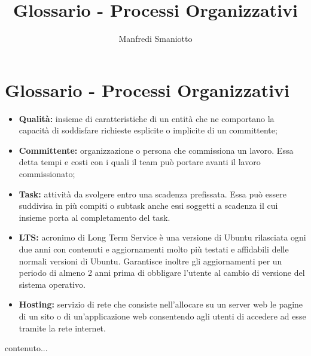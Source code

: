 \documentclass[openany,12pt,a4paper]{report}
\title{Glossario - Processi Organizzativi}
\author{Manfredi Smaniotto}
\begin{document}
	\chapter{Glossario - Processi Organizzativi}
	
	\begin{itemize}
		\item{\textbf{Qualità:}} insieme di caratteristiche di un entità che ne comportano la capacità di soddisfare richieste esplicite o implicite di un committente;
		\item{\textbf{Committente:}} organizzazione o persona che commissiona un lavoro. Essa detta tempi e costi con i quali il team può portare avanti il lavoro commissionato;
		\item{\textbf{Task:}} attività da svolgere entro una scadenza prefissata. Essa può essere suddivisa in più compiti o subtask anche essi soggetti a scadenza il cui insieme porta al completamento del task.
		\item{\textbf{LTS:}} acronimo di Long Term Service è una versione di Ubuntu rilasciata ogni due anni con contenuti e aggiornamenti molto più testati e affidabili delle normali versioni di Ubuntu. Garantisce inoltre gli aggiornamenti per un periodo di almeno 2 anni prima di obbligare l'utente al cambio di versione del sistema operativo.
		\item {\textbf{Hosting:}} servizio di rete che consiste nell'allocare su un server web le pagine di un sito o di un'applicazione web consentendo agli utenti di accedere ad esse tramite la rete internet.
	\end{itemize}
	contenuto...
\end{document}
